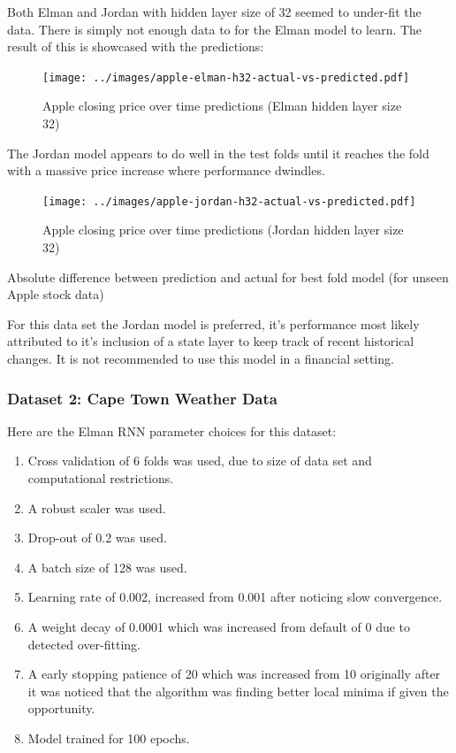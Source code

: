 \documentclass[conference]{IEEEtran}
\begin{document}
Both Elman and Jordan with hidden layer size of 32 seemed to under-fit the data. There is simply not enough data to for the Elman model to learn. The result of this is showcased with the predictions:

\begin{figure}[H] 
	\centering
	\texttt{[image: ../images/apple-elman-h32-actual-vs-predicted.pdf]}
	\caption{Apple closing price over time predictions (Elman hidden layer size 32)}
	\label{fig:apple-closing-predictions}
\end{figure}

The Jordan model appears to do well in the test folds until it reaches the fold with a massive price increase where performance dwindles.

\begin{figure}[H] 
	\centering
	\texttt{[image: ../images/apple-jordan-h32-actual-vs-predicted.pdf]}
	\caption{Apple closing price over time predictions (Jordan hidden layer size 32)}
	\label{fig:apple-closing-predictions-jordan}
\end{figure}

\begin{table}[H]
	\caption{Absolute difference between prediction and actual for best fold model (for unseen Apple stock data)}
	\label{tab:apple-rnn-summary}
\end{table}


For this data set the Jordan model is preferred, it's performance most likely attributed to it's inclusion of a state layer to keep track of recent historical changes. It is not recommended to use this model in a financial setting.


\subsubsection{Dataset 2: Cape Town Weather Data}

Here are the Elman RNN parameter choices for this dataset:

\begin{enumerate}[]
	\item Cross validation of 6 folds was used, due to size of data set and computational restrictions.
	\item A robust scaler was used.
	\item Drop-out of 0.2 was used.
	\item A batch size of 128 was used.
	\item Learning rate of 0.002, increased from 0.001 after noticing slow convergence.
	\item A weight decay of 0.0001 which was increased from default of 0 due to detected over-fitting.
	\item A early stopping patience of 20 which was increased from 10 originally after it was noticed that the algorithm was finding better local minima if given the opportunity.
	\item Model trained for 100 epochs.
\end{enumerate}
\end{document}
